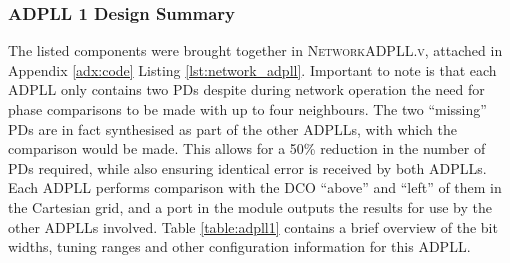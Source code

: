 \subsubsection{\acs{ADPLL} 1 Design Summary}
The listed components were brought together in \textsc{NetworkADPLL.v}, attached in Appendix \ref{adx:code} Listing \ref{lst:network_adpll}. Important to note is that each \ac{ADPLL} only contains two \aclp{PD} despite during network operation the need for phase comparisons to be made with up to four neighbours. The two ``missing'' \acp{PD} are in fact synthesised as part of the other \acp{ADPLL}, with which the comparison would be made. This allows for a 50\% reduction in the number of \acp{PD} required, while also ensuring identical error is received by both \acp{ADPLL}. Each \ac{ADPLL} performs comparison with the \ac{DCO} ``above'' and ``left'' of them in the Cartesian grid, and a port in the module outputs the results for use by the other \acp{ADPLL} involved. %
Table \ref{table:adpll1} contains a brief overview of the bit widths, tuning ranges and other configuration information for this \ac{ADPLL}.
